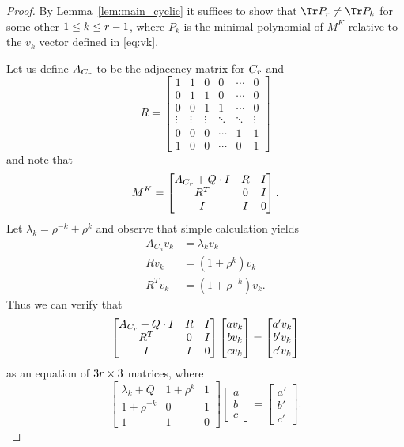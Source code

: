 \begin{proof}
By Lemma~\ref{lem:main_cyclic} it suffices to show that $\Tr P_{\ord} \neq \Tr P_k$ for some other $1 \leq k \leq r -1$, where $P_k$ is the minimal polynomial of $M^K$ relative to the $v_k$ vector defined in \eqref{eq:vk}.

Let us define $A_{C_r}$ to be the adjacency matrix for $C_r$ and \[R=\begin{bmatrix}1&1&0&0&\cdots& 0\\0&1&1&0&\cdots&0\\0&0&1&1&\cdots&0\\\vdots&\vdots&\vdots&\ddots&\ddots&\vdots\\0&0&0&\cdots&1&1\\1&0&0&\cdots&0&1\end{bmatrix}\] and note that 
\[M^K = \begin{bmatrix}A_{C_r}+Q\cdot I&R&I\\R^T&0&I\\I&I&0\end{bmatrix}.\]
Let $\lambda_k=\rho^{-k}+\rho^k$ and observe that simple calculation yields 
\begin{align*}
A_{C_n}v_k &= \lambda_k v_k\\
R v_k &= (1+\rho^k) v_k\\
R^T v_k &= (1+\rho^{-k}) v_k.
\end{align*}
Thus we can verify that 
\[
\begin{bmatrix}A_{C_r}+Q\cdot I&R&I\\R^T&0&I\\I&I&0\end{bmatrix}\begin{bmatrix}a v_k\\b v_k\\ c v_k\end{bmatrix}=\begin{bmatrix}a' v_k\\b ' v_k \\ c' v_k\end{bmatrix}
\]
as an equation of $3r \times 3$ matrices, where
\[
\begin{bmatrix}\lambda_k+Q&1+\rho^k&1\\1+\rho^{-k}&0&1\\1&1&0\end{bmatrix} \begin{bmatrix} a \\ b \\ c \end{bmatrix}= \begin{bmatrix}a' \\ b' \\ c' \end{bmatrix}.
\]


\end{proof}

